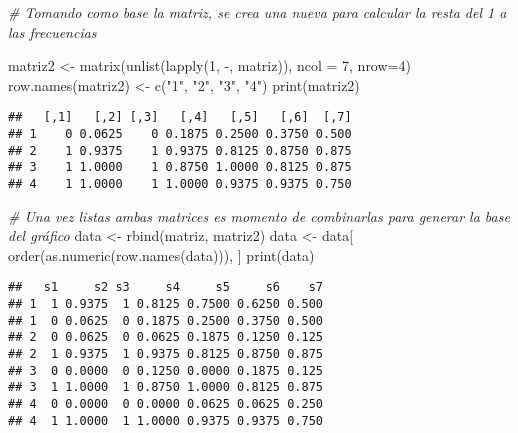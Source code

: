 \documentclass[
  12pt,
]{article}
\newenvironment{Shaded}{\begin{snugshade}}{\end{snugshade}}
\newcommand{\AttributeTok}[1]{\textcolor[rgb]{0.77,0.63,0.00}{#1}}
\newcommand{\CommentTok}[1]{\textcolor[rgb]{0.56,0.35,0.01}{\textit{#1}}}
\newcommand{\DecValTok}[1]{\textcolor[rgb]{0.00,0.00,0.81}{#1}}
\newcommand{\FunctionTok}[1]{\textcolor[rgb]{0.00,0.00,0.00}{#1}}
\newcommand{\NormalTok}[1]{#1}
\newcommand{\OtherTok}[1]{\textcolor[rgb]{0.56,0.35,0.01}{#1}}
\newcommand{\StringTok}[1]{\textcolor[rgb]{0.31,0.60,0.02}{#1}}
\begin{document}
\begin{Shaded}
\begin{Highlighting}[]
\CommentTok{\# Tomando como base la matriz, se crea una nueva para calcular la resta del 1 a las frecuencias}

\NormalTok{matriz2 }\OtherTok{\textless{}{-}} \FunctionTok{matrix}\NormalTok{(}\FunctionTok{unlist}\NormalTok{(}\FunctionTok{lapply}\NormalTok{(}\DecValTok{1}\NormalTok{, }\StringTok{\textasciigrave{}}\AttributeTok{{-}}\StringTok{\textasciigrave{}}\NormalTok{, matriz)), }\AttributeTok{ncol =} \DecValTok{7}\NormalTok{, }\AttributeTok{nrow=}\DecValTok{4}\NormalTok{)}
\FunctionTok{row.names}\NormalTok{(matriz2) }\OtherTok{\textless{}{-}} \FunctionTok{c}\NormalTok{(}\StringTok{"1"}\NormalTok{, }\StringTok{"2"}\NormalTok{, }\StringTok{"3"}\NormalTok{, }\StringTok{"4"}\NormalTok{)}
\FunctionTok{print}\NormalTok{(matriz2)}
\end{Highlighting}
\end{Shaded}

\begin{verbatim}
##   [,1]   [,2] [,3]   [,4]   [,5]   [,6]  [,7]
## 1    0 0.0625    0 0.1875 0.2500 0.3750 0.500
## 2    1 0.9375    1 0.9375 0.8125 0.8750 0.875
## 3    1 1.0000    1 0.8750 1.0000 0.8125 0.875
## 4    1 1.0000    1 1.0000 0.9375 0.9375 0.750
\end{verbatim}

\begin{Shaded}
\begin{Highlighting}[]
\CommentTok{\# Una vez listas ambas matrices es momento de combinarlas para generar la base del gráfico}
\NormalTok{data }\OtherTok{\textless{}{-}} \FunctionTok{rbind}\NormalTok{(matriz, matriz2)}
\NormalTok{data }\OtherTok{\textless{}{-}}\NormalTok{ data[ }\FunctionTok{order}\NormalTok{(}\FunctionTok{as.numeric}\NormalTok{(}\FunctionTok{row.names}\NormalTok{(data))), ]}
\FunctionTok{print}\NormalTok{(data)}
\end{Highlighting}
\end{Shaded}

\begin{verbatim}
##   s1     s2 s3     s4     s5     s6    s7
## 1  1 0.9375  1 0.8125 0.7500 0.6250 0.500
## 1  0 0.0625  0 0.1875 0.2500 0.3750 0.500
## 2  0 0.0625  0 0.0625 0.1875 0.1250 0.125
## 2  1 0.9375  1 0.9375 0.8125 0.8750 0.875
## 3  0 0.0000  0 0.1250 0.0000 0.1875 0.125
## 3  1 1.0000  1 0.8750 1.0000 0.8125 0.875
## 4  0 0.0000  0 0.0000 0.0625 0.0625 0.250
## 4  1 1.0000  1 1.0000 0.9375 0.9375 0.750
\end{verbatim}
\end{document}
